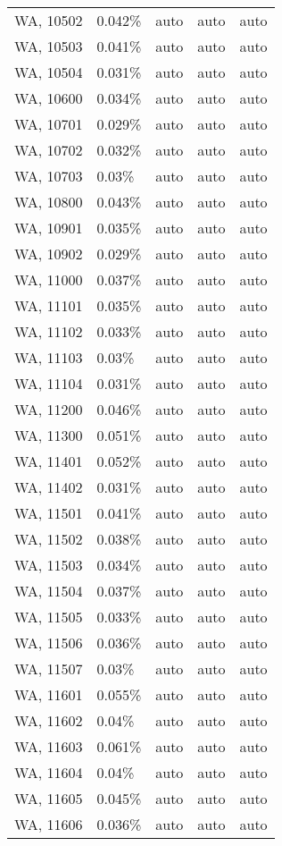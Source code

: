 \begin{longtable}[]{@{}lllll@{}}
WA, 10502 & 0.042\% & auto & auto & auto \\
WA, 10503 & 0.041\% & auto & auto & auto \\
WA, 10504 & 0.031\% & auto & auto & auto \\
WA, 10600 & 0.034\% & auto & auto & auto \\
WA, 10701 & 0.029\% & auto & auto & auto \\
WA, 10702 & 0.032\% & auto & auto & auto \\
WA, 10703 & 0.03\% & auto & auto & auto \\
WA, 10800 & 0.043\% & auto & auto & auto \\
WA, 10901 & 0.035\% & auto & auto & auto \\
WA, 10902 & 0.029\% & auto & auto & auto \\
WA, 11000 & 0.037\% & auto & auto & auto \\
WA, 11101 & 0.035\% & auto & auto & auto \\
WA, 11102 & 0.033\% & auto & auto & auto \\
WA, 11103 & 0.03\% & auto & auto & auto \\
WA, 11104 & 0.031\% & auto & auto & auto \\
WA, 11200 & 0.046\% & auto & auto & auto \\
WA, 11300 & 0.051\% & auto & auto & auto \\
WA, 11401 & 0.052\% & auto & auto & auto \\
WA, 11402 & 0.031\% & auto & auto & auto \\
WA, 11501 & 0.041\% & auto & auto & auto \\
WA, 11502 & 0.038\% & auto & auto & auto \\
WA, 11503 & 0.034\% & auto & auto & auto \\
WA, 11504 & 0.037\% & auto & auto & auto \\
WA, 11505 & 0.033\% & auto & auto & auto \\
WA, 11506 & 0.036\% & auto & auto & auto \\
WA, 11507 & 0.03\% & auto & auto & auto \\
WA, 11601 & 0.055\% & auto & auto & auto \\
WA, 11602 & 0.04\% & auto & auto & auto \\
WA, 11603 & 0.061\% & auto & auto & auto \\
WA, 11604 & 0.04\% & auto & auto & auto \\
WA, 11605 & 0.045\% & auto & auto & auto \\
WA, 11606 & 0.036\% & auto & auto & auto \\

\end{longtable}
